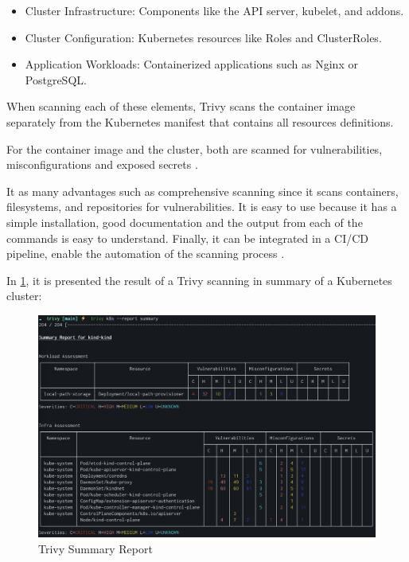 \documentclass[a4paper,11pt,openright,BCOR=15mm]{scrbook}
\begin{document}
\begin{itemize}
	\item Cluster Infrastructure: Components like the API server, kubelet, and addons.
	\item Cluster Configuration: Kubernetes resources like Roles and ClusterRoles.
	\item Application Workloads: Containerized applications such as Nginx or PostgreSQL.
\end{itemize}

When scanning each of these elements, Trivy scans the container image separately from the Kubernetes manifest that contains all resources definitions.

For the container image and the cluster, both are scanned for vulnerabilities, misconfigurations and exposed secrets \cite{trivy_doc_kubernetes_nodate}.

It as many advantages such as comprehensive scanning since it scans containers, filesystems, and repositories for vulnerabilities. It is easy to use because it has a simple installation, good documentation and the output from each of the commands is easy to understand. Finally, it can be integrated in a CI/CD pipeline, enable the automation of the scanning process \cite{benhassan_deep_2024}.

In \ref{fig:trivyResult}, it is presented the result of a Trivy scanning in summary of a Kubernetes cluster:

\begin{figure}[h!]
	\centering
	\label{fig:trivyResult}
	\includegraphics[scale=0.3]{figs/trivy-summary-output.png}
	\caption{Trivy Summary Report \cite{trivy_doc_kubernetes_nodate}}
\end{figure}
\end{document}
